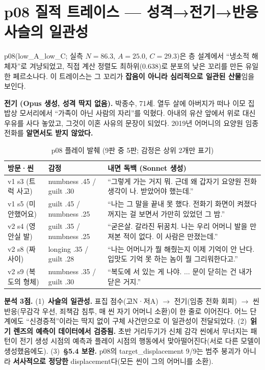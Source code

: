 \documentclass[11pt, a4paper]{article}
\begin{document}
\appendix
\section{p08 질적 트레이스 --- 성격→전기→반응 사슬의 일관성}

p08(low\_A\_low\_C; 실측 $N=86.3$, $A=25.0$, $C=29.3$)은 층 설계에서 ``냉소적 해체자''로 겨냥되었고, 직접 계산 정렬도 최하위(0.638)로 분포의 낮은 꼬리를 만든 유일한 페르소나다. 이 트레이스는 그 꼬리가 \textbf{잡음이 아니라 심리적으로 일관된 산물}임을 보인다.

\noindent\textbf{전기 (Opus 생성, 성격 딱지 없음).} 박종수, 71세. 열두 살에 아버지가 떠나 이모 집 밥상 모서리에서 ``가족이 아닌 사람의 자리''를 익혔다. 아내의 유산 앞에서 위로 대신 우유를 사다 놓았고, 그것이 이혼 사유의 문장이 되었다. 2019년 어머니의 요양원 임종 전화를 \textbf{알면서도 받지 않았다.}

\begin{table}[H]
\centering
\caption{p08 플레이 발췌 (9판 중 5판; 감정은 상위 2개만 표기)}
\small
\begin{tabular}{l l p{7.6cm}}
\toprule
\textbf{방문·씬} & \textbf{감정} & \textbf{내면 독백 (Sonnet 생성)} \\
\midrule
v1 s3 (트럭 사고) & numbness .45 / guilt .30 & ``그렇게 가는 거지 뭐. 근데 왜 갑자기 요양원 전화 생각이 나. 받았어야 했는데.'' \\
v1 s5 (미안했어요) & guilt .45 / numbness .25 & ``나는 그 말을 끝내 못 했다. 전화기 화면이 켜졌다 꺼지는 걸 보면서 가만히 있었던 그 밤.'' \\
v2 s4 (영안실 발) & guilt .35 / numbness .25 & ``굳은살. 갈라진 뒤꿈치. 나는 우리 어머니 발을 만져본 적이 없다. 이 사람은 만졌는데.'' \\
v2 s8 (짜사이) & longing .35 / guilt .28 & ``나는 어머니가 뭘 해줬는지 이제 기억이 안 난다. 입맛도 기억 못 하는 놈이 뭘 그리워한다고.'' \\
v2 s9 (복도의 형체) & numbness .35 / guilt .30 & ``복도에 서 있는 게 나야. $\ldots$ 문이 닫히는 건 내가 닫은 거지.'' \\
\bottomrule
\end{tabular}
\end{table}

\noindent\textbf{분석 3점.} (1)~\textbf{사슬의 일관성.} 표집 점수(고N·저A) $\rightarrow$ 전기(임종 전화 회피) $\rightarrow$ 씬 반응(무감각 우선, 죄책감 침투, 매 씬 자기 어머니 소환)이 한 줄로 이어진다. 어느 단계에도 ``신경증적''이라는 딱지 없이 구체 사건만으로 이 일관성이 전달되었다. (2)~\textbf{읽기 렌즈의 예측이 데이터에서 검증됨.} 초반 거리두기가 신체 감각 씬에서 무너지는 패턴이 전기 생성 시점의 예측과 플레이 시점의 행동에서 맞아떨어진다(서로 다른 모델이 생성했음에도). (3)~\textbf{§5.4 보완.} p08의 target\_displacement 9/9는 범주 붕괴가 아니라 \textbf{서사적으로 정당한} displacement다(모든 씬이 그의 어머니를 소환).
\end{document}
